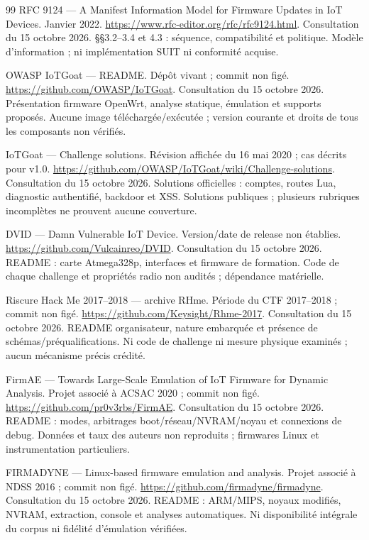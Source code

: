 \documentclass[11pt,a4paper]{article}
\begin{document}
\begin{thebibliography}{99}
 RFC 9124 --- A Manifest Information Model for Firmware Updates in IoT Devices. Janvier 2022. \url{https://www.rfc-editor.org/rfc/rfc9124.html}. Consultation du 15 octobre 2026. §§3.2--3.4 et 4.3 : séquence, compatibilité et politique. Modèle d'information ; ni implémentation SUIT ni conformité acquise.

 OWASP IoTGoat --- README. Dépôt vivant ; commit non figé. \url{https://github.com/OWASP/IoTGoat}. Consultation du 15 octobre 2026. Présentation firmware OpenWrt, analyse statique, émulation et supports proposés. Aucune image téléchargée/exécutée ; version courante et droits de tous les composants non vérifiés.

 IoTGoat --- Challenge solutions. Révision affichée du 16 mai 2020 ; cas décrits pour v1.0. \url{https://github.com/OWASP/IoTGoat/wiki/Challenge-solutions}. Consultation du 15 octobre 2026. Solutions officielles : comptes, routes Lua, diagnostic authentifié, backdoor et XSS. Solutions publiques ; plusieurs rubriques incomplètes ne prouvent aucune couverture.

 DVID --- Damn Vulnerable IoT Device. Version/date de release non établies. \url{https://github.com/Vulcainreo/DVID}. Consultation du 15 octobre 2026. README : carte Atmega328p, interfaces et firmware de formation. Code de chaque challenge et propriétés radio non audités ; dépendance matérielle.

 Riscure Hack Me 2017--2018 --- archive RHme. Période du CTF 2017--2018 ; commit non figé. \url{https://github.com/Keysight/Rhme-2017}. Consultation du 15 octobre 2026. README organisateur, nature embarquée et présence de schémas/préqualifications. Ni code de challenge ni mesure physique examinés ; aucun mécanisme précis crédité.

 FirmAE --- Towards Large-Scale Emulation of IoT Firmware for Dynamic Analysis. Projet associé à ACSAC 2020 ; commit non figé. \url{https://github.com/pr0v3rbs/FirmAE}. Consultation du 15 octobre 2026. README : modes, arbitrages boot/réseau/NVRAM/noyau et connexions de debug. Données et taux des auteurs non reproduits ; firmwares Linux et instrumentation particuliers.

 FIRMADYNE --- Linux-based firmware emulation and analysis. Projet associé à NDSS 2016 ; commit non figé. \url{https://github.com/firmadyne/firmadyne}. Consultation du 15 octobre 2026. README : ARM/MIPS, noyaux modifiés, NVRAM, extraction, console et analyses automatiques. Ni disponibilité intégrale du corpus ni fidélité d'émulation vérifiées.


\end{thebibliography}
\end{document}
